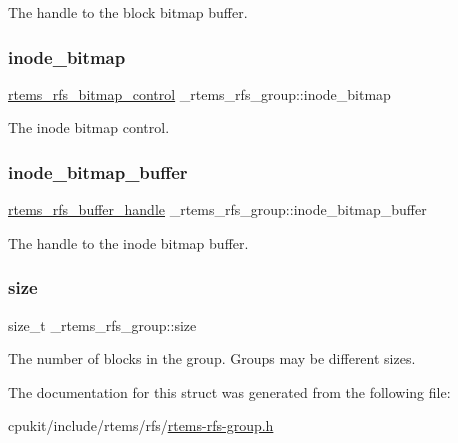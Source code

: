 The handle to the block bitmap buffer. \mbox{\label{struct__rtems__rfs__group_afd8374ac9ef10d22e4cbd178c152c91b}} 
\subsubsection{\texorpdfstring{inode\_bitmap}{inode\_bitmap}}
{\footnotesize\ttfamily \mbox{\hyperlink{rtems-rfs-bitmaps_8h_aa1b1de5abc294444428eb1038d7f898b}{rtems\+\_\+rfs\+\_\+bitmap\+\_\+control}} \+\_\+rtems\+\_\+rfs\+\_\+group\+::inode\+\_\+bitmap}

The inode bitmap control. \mbox{\label{struct__rtems__rfs__group_a59ece6106520b2bf8052d6209b5aa3a9}} 
\subsubsection{\texorpdfstring{inode\_bitmap\_buffer}{inode\_bitmap\_buffer}}
{\footnotesize\ttfamily \mbox{\hyperlink{rtems-rfs-buffer_8h_a17f97c37c5273ad28d413dfd2d175e23}{rtems\+\_\+rfs\+\_\+buffer\+\_\+handle}} \+\_\+rtems\+\_\+rfs\+\_\+group\+::inode\+\_\+bitmap\+\_\+buffer}

The handle to the inode bitmap buffer. \mbox{\label{struct__rtems__rfs__group_a3fbf816cf7cf3efbb818c150e030c0f9}} 
\subsubsection{\texorpdfstring{size}{size}}
{\footnotesize\ttfamily size\+\_\+t \+\_\+rtems\+\_\+rfs\+\_\+group\+::size}

The number of blocks in the group. Groups may be different sizes. 

The documentation for this struct was generated from the following file\+:\begin{DoxyCompactItemize}
\item 
cpukit/include/rtems/rfs/\mbox{\hyperlink{rtems-rfs-group_8h}{rtems-\/rfs-\/group.\+h}}\end{DoxyCompactItemize}
